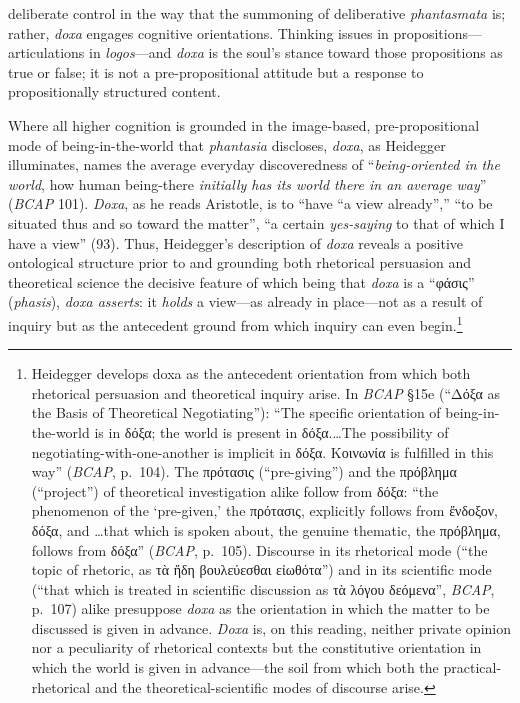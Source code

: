 \documentclass{article}
\newcommand{\gk}[1]{{\greekfont #1}}
\begin{document}
deliberate control in the way that the summoning of deliberative \textit{phantasmata} is; rather, \textit{doxa} engages cognitive orientations. Thinking issues in propositions---articulations in \textit{logos}---and \textit{doxa} is the soul's stance toward those propositions as true or false; it is not a pre-propositional attitude but a response to propositionally structured content.

Where all higher cognition is grounded in the image-based, pre-propositional mode of being-in-the-world that \textit{phantasia} discloses, \textit{doxa}, as Heidegger illuminates, names the average everyday discoveredness of ``\textit{being-oriented in the world}, how human being-there \textit{initially has its world there in an average way}'' (\textit{BCAP} 101). \textit{Doxa}, as he reads Aristotle, is to ``have ``a view already'','' ``to be situated thus and so toward the matter'', ``a certain \textit{yes-saying} to that of which I have a view'' (93). Thus, Heidegger's description of \textit{doxa} reveals a positive ontological structure prior to and grounding both rhetorical persuasion and theoretical science the decisive feature of which being that \textit{doxa} is a ``\gk{φάσις}'' (\textit{phasis}), \textit{doxa asserts}: it \textit{holds} a view---as already in place---not as a result of inquiry but as the antecedent ground from which inquiry can even begin.\footnote{Heidegger develops doxa as the antecedent orientation from which both rhetorical persuasion and theoretical inquiry arise. In \textit{BCAP} §15e (``\gk{Δόξα} as the Basis of Theoretical Negotiating''): ``The specific orientation of being-in-the-world is in \gk{δόξα}; the world is present in \gk{δόξα}.\dots The possibility of negotiating-with-one-another is implicit in \gk{δόξα}. \gk{Κοινωνία} is fulfilled in this way'' (\textit{BCAP}, p.~104). The \gk{πρότασις} (``pre-giving'') and the \gk{πρόβλημα} (``project'') of theoretical investigation alike follow from \gk{δόξα}: ``the phenomenon of the `pre-given,' the \gk{πρότασις}, explicitly follows from \gk{ἔνδοξον}, \gk{δόξα}, and \dots that which is spoken about, the genuine thematic, the \gk{πρόβλημα}, follows from \gk{δόξα}'' (\textit{BCAP}, p.~105). Discourse in its rhetorical mode (``the topic of rhetoric, as \gk{τὰ ἤδη βουλεύεσθαι εἰωθότα}'') and in its scientific mode (``that which is treated in scientific discussion as \gk{τὰ λόγου δεόμενα}'', \textit{BCAP}, p.~107) alike presuppose \textit{doxa} as the orientation in which the matter to be discussed is given in advance. \textit{Doxa} is, on this reading, neither private opinion nor a peculiarity of rhetorical contexts but the constitutive orientation in which the world is given in advance---the soil from which both the practical-rhetorical and the theoretical-scientific modes of discourse arise.}
\end{document}
